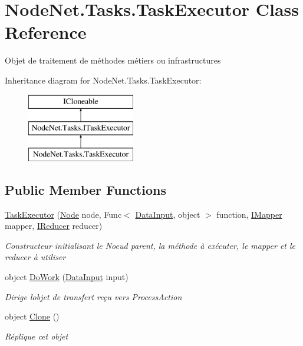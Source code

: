 \hypertarget{class_node_net_1_1_tasks_1_1_task_executor}{}\section{Node\+Net.\+Tasks.\+Task\+Executor Class Reference}
\label{class_node_net_1_1_tasks_1_1_task_executor}


Objet de traitement de méthodes métiers ou infrastructures  


Inheritance diagram for Node\+Net.\+Tasks.\+Task\+Executor\+:\begin{figure}[H]
\begin{center}
\leavevmode
\includegraphics[height=3.000000cm]{class_node_net_1_1_tasks_1_1_task_executor}
\end{center}
\end{figure}
\subsection*{Public Member Functions}
\begin{DoxyCompactItemize}
\item 
\hyperlink{class_node_net_1_1_tasks_1_1_task_executor_a30c5b0e9e3d5e6e6ec08889a43c9c9a2}{Task\+Executor} (\hyperlink{class_node_net_1_1_network_1_1_nodes_1_1_node}{Node} node, Func$<$ \hyperlink{class_node_net_1_1_data_1_1_data_input}{Data\+Input}, object $>$ function, \hyperlink{interface_node_net_1_1_map___reduce_1_1_i_mapper}{I\+Mapper} mapper, \hyperlink{interface_node_net_1_1_map___reduce_1_1_i_reducer}{I\+Reducer} reducer)
\begin{DoxyCompactList}\small\item\em Constructeur initialisant le Noeud parent, la méthode à exécuter, le mapper et le reducer à utiliser \end{DoxyCompactList}\item 
object \hyperlink{class_node_net_1_1_tasks_1_1_task_executor_ad42635f3fd256939000c4f77705d2d42}{Do\+Work} (\hyperlink{class_node_net_1_1_data_1_1_data_input}{Data\+Input} input)
\begin{DoxyCompactList}\small\item\em Dirige l\textquotesingle{}objet de transfert reçu vers Process\+Action \end{DoxyCompactList}\item 
object \hyperlink{class_node_net_1_1_tasks_1_1_task_executor_a6ac461a0244f65664db2cbe1d8f8182c}{Clone} ()
\begin{DoxyCompactList}\small\item\em Réplique cet objet \end{DoxyCompactList}\end{DoxyCompactItemize}
